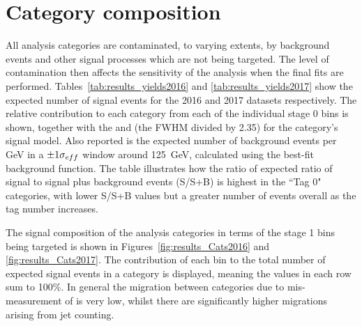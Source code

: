 \section{Category composition}

All analysis categories are contaminated, to varying extents, 
by background events and other signal processes which are not being targeted.
The level of contamination then affects the sensitivity of the analysis 
when the final fits are performed.
Tables~\ref{tab:results_yields2016} and \ref{tab:results_yields2017} 
show the expected number of signal events for the 2016 and 2017 datasets respectively.
The relative contribution to each category from each of the individual stage 0 bins is shown, 
together with the \seff and \shm (the FWHM divided by 2.35) for the category's signal model.
Also reported is the expected number of background events per GeV in a $\pm1\sigma_{eff}$ window 
around \SI{125}{GeV}, calculated using the best-fit background function.
The table illustrates how the ratio of expected ratio of signal 
to signal plus background events (S/S+B) is highest in the ``Tag 0" categories, 
with lower S/S+B values but a greater number of events overall as the tag number increases.

The signal composition of the analysis categories in terms of the stage 1 bins being targeted
is shown in Figures~\ref{fig:results_Cats2016} and \ref{fig:results_Cats2017}.
The contribution of each bin to the total number of expected signal events in a category is displayed, 
meaning the values in each row sum to 100\%.
In general the migration between categories due to mis-measurement of \ptgg is very low, 
whilst there are significantly higher migrations arising from jet counting.

